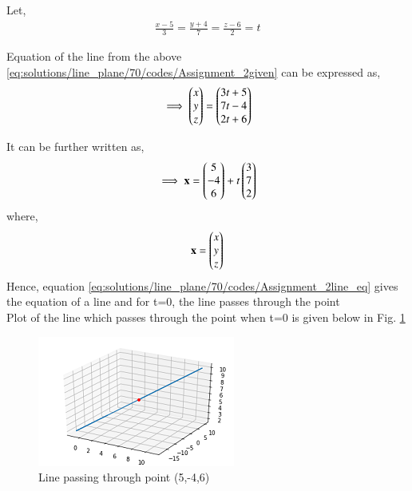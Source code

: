 Let,
\begin{align} \label{eq:solutions/line_plane/70/codes/Assignment_2given}
    \frac{x-5}{3} = \frac{y+4}{7} = \frac{z-6}{2} = t
\end{align}

Equation of the line from the above \eqref{eq:solutions/line_plane/70/codes/Assignment_2given} can be expressed as,
\begin{align} \label{eq:solutions/line_plane/70/codes/Assignment_2parametricform}
\implies    \begin{pmatrix}x \\ y \\ z\end{pmatrix} = \begin{pmatrix}3t+5 \\ 7t-4 \\ 2t+6\end{pmatrix}
\end{align}

It can be further written as,
\begin{align} \label{eq:solutions/line_plane/70/codes/Assignment_2line_eq}
\implies    \textbf{x} = \begin{pmatrix}5 \\ -4 \\ 6\end{pmatrix} + t\begin{pmatrix}3 \\ 7 \\2\end{pmatrix}
\end{align}
where,
\begin{align} \label{eq:solutions/line_plane/70/codes/Assignment_2vector_x}
	\textbf{x} = \begin{pmatrix}x \\ y \\ z\end{pmatrix}
\end{align}
Hence, equation \ref{eq:solutions/line_plane/70/codes/Assignment_2line_eq} gives the equation of a line and for t=0, the line passes through the point  \\
Plot of the line which passes through the point when t=0 is given below in Fig. \ref{myplot:solutions/line_plane/70/codes/Assignment_2}

\begin{figure}[h!]
\centering
\includegraphics[width=\columnwidth]{./solutions/line_plane/70/codes/Assignment_2}  
\caption{Line passing through point (5,-4,6)}
\label{myplot:solutions/line_plane/70/codes/Assignment_2}
\end{figure}
